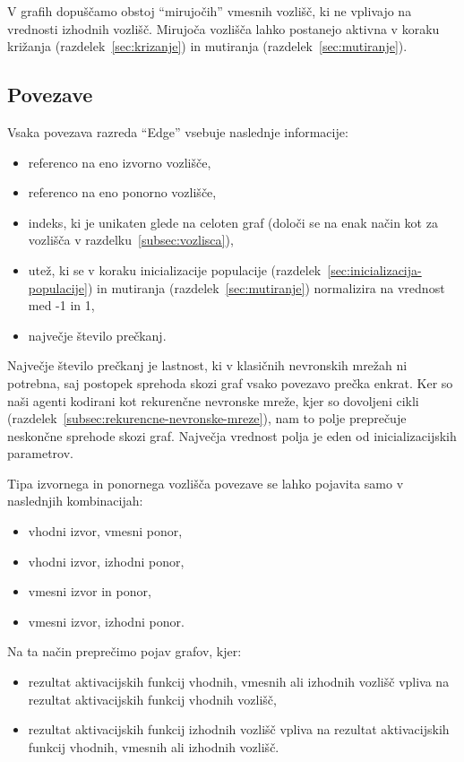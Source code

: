 \documentclass[a4paper,12pt,openright]{book}
\begin{document}
    V grafih dopuščamo obstoj \enquote{mirujočih} vmesnih vozlišč, ki ne vplivajo na vrednosti izhodnih vozlišč.
    Mirujoča vozlišča lahko postanejo aktivna v koraku križanja (razdelek~\ref{sec:krizanje}) in mutiranja (razdelek~\ref{sec:mutiranje}).

    \subsection{Povezave}\label{subsec:povezave}
    Vsaka povezava razreda \enquote{Edge} vsebuje naslednje informacije:
    \begin{itemize}
        \item referenco na eno izvorno vozlišče,
        \item referenco na eno ponorno vozlišče,
        \item indeks, ki je unikaten glede na celoten graf (določi se na enak način kot za vozlišča v razdelku~\ref{subsec:vozlisca}),
        \item utež, ki se v koraku inicializacije populacije (razdelek~\ref{sec:inicializacija-populacije}) in mutiranja (razdelek~\ref{sec:mutiranje}) normalizira na vrednost med -1 in 1,
        \item največje število prečkanj.
    \end{itemize}

    Največje število prečkanj je lastnost, ki v klasičnih nevronskih mrežah ni potrebna, saj postopek sprehoda skozi graf
    vsako povezavo prečka enkrat.
    Ker so naši agenti kodirani kot rekurenčne nevronske mreže, kjer so dovoljeni cikli (razdelek~\ref{subsec:rekurencne-nevronske-mreze}),
    nam to polje preprečuje neskončne sprehode skozi graf.
    Največja vrednost polja je eden od inicializacijskih parametrov.

    Tipa izvornega in ponornega vozlišča povezave se lahko pojavita samo v naslednjih kombinacijah:
    \begin{itemize}
        \item vhodni izvor, vmesni ponor,
        \item vhodni izvor, izhodni ponor,
        \item vmesni izvor in ponor,
        \item vmesni izvor, izhodni ponor.
    \end{itemize}
    Na ta način preprečimo pojav grafov, kjer:
    \begin{itemize}
        \item rezultat aktivacijskih funkcij vhodnih, vmesnih ali izhodnih vozlišč vpliva na
        rezultat aktivacijskih funkcij vhodnih vozlišč,
        \item rezultat aktivacijskih funkcij izhodnih vozlišč vpliva na rezultat aktivacijskih funkcij vhodnih,
        vmesnih ali izhodnih vozlišč.
    \end{itemize}
\end{document}
